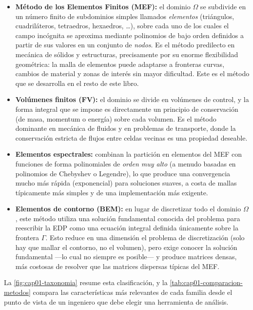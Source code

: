 \begin{itemize}[leftmargin=1.4em]
\item \textbf{Método de los Elementos Finitos (MEF):} el dominio $\Omega$ se subdivide en un número finito de subdominios simples llamados \emph{elementos} (triángulos, cuadriláteros, tetraedros, hexaedros, \dots), sobre cada uno de los cuales el campo incógnita se aproxima mediante polinomios de bajo orden definidos a partir de sus valores en un conjunto de \emph{nodos}. Es el método predilecto en mecánica de sólidos y estructuras, precisamente por su enorme flexibilidad geométrica: la malla de elementos puede adaptarse a fronteras curvas, cambios de material y zonas de interés sin mayor dificultad. Este es el método que se desarrolla en el resto de este libro.
\item \textbf{Volúmenes finitos (FV):} el dominio se divide en volúmenes de control, y la forma integral que se impone es directamente un principio de conservación (de masa, momentum o energía) sobre cada volumen. Es el método dominante en mecánica de fluidos y en problemas de transporte, donde la conservación estricta de flujos entre celdas vecinas es una propiedad deseable.
\item \textbf{Elementos espectrales:} combinan la partición en elementos del MEF con funciones de forma polinomiales de \emph{orden muy alto} (a menudo basadas en polinomios de Chebyshev o Legendre), lo que produce una convergencia mucho más rápida (exponencial) para soluciones suaves, a costa de mallas típicamente más simples y de una implementación más exigente.
\item \textbf{Elementos de contorno (BEM):} en lugar de discretizar todo el dominio $\Omega$, este método utiliza una solución fundamental conocida del problema para reescribir la EDP como una ecuación integral definida únicamente sobre la frontera $\Gamma$. Esto reduce en una dimensión el problema de discretización (solo hay que mallar el contorno, no el volumen), pero exige conocer la solución fundamental —lo cual no siempre es posible— y produce matrices densas, más costosas de resolver que las matrices dispersas típicas del MEF.
\end{itemize}

La \cref{fig:cap01-taxonomia} resume esta clasificación, y la \cref{tab:cap01-comparacion-metodos} compara las características más relevantes de cada familia desde el punto de vista de un ingeniero que debe elegir una herramienta de análisis.

